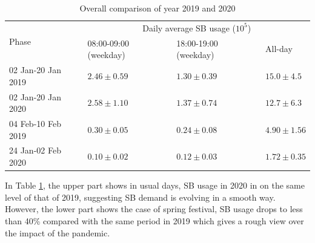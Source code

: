 \documentclass[preprints,ijgi,submit,moreauthors]{Definitions/mdpi}
\begin{document}
\begin{table}[H]
    \centering
    \begin{tabular}{|l|l|l|l|}
        \hline
        \multirow{2}{*}{Phase} &\multicolumn{3}{c|}{Daily average SB usage ($10^{5}$)}\\
        \cline{2-4}
        & 08:00-09:00 (weekday) & 18:00-19:00 (weekday) & All-day\\
        \hline
        02 Jan-20 Jan 2019 & $2.46\pm0.59$ & $1.30\pm0.39$ & $15.0\pm4.5$\\
        \hline
        02 Jan-20 Jan 2020 & $2.58\pm1.10$ & $1.37\pm0.74$ & $12.7\pm6.3$\\
        \hline
        \hline
        04 Feb-10 Feb 2019 & $0.30\pm0.05$ & $0.24\pm0.08$ & $4.90\pm1.56$\\
        \hline
        24 Jan-02 Feb 2020 & $0.10\pm0.02$ & $0.12\pm0.03$ & $1.72\pm0.35$\\
        \hline
    \end{tabular}
    \caption{Overall comparison of year 2019 and 2020}\label{tab:overall_comparison}
\end{table}

In Table \ref{tab:overall_comparison}, the upper part shows in usual days, SB usage in 2020 in on the same level of that of 2019, suggesting SB demand is evolving in a smooth way.
However, the lower part shows the case of spring festival, SB usage drops to less than 40\% compared with the same period in 2019 which gives a rough view over the impact of the pandemic.

\end{document}
